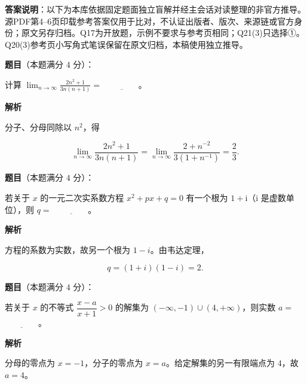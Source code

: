 

\begin{gktip}
\textbf{答案说明}：以下为本库依据固定题面独立盲解并经主会话对读整理的非官方推导。源PDF第4–6页印载参考答案仅用于比对，不认证出版者、版次、来源链或官方身份；原文另存归档。Q17为开放题，示例不要求与参考页相同；Q21(3)只选择①。Q20(3)参考页小写角式笔误保留在原文归档，本稿使用独立推导。
\end{gktip}

\begin{answer}

\textbf{题目}（本题满分 $4$ 分）：

计算 $\displaystyle\lim_{n\to\infty}\frac{2n^2+1}{3n(n+1)}=$ $\underline{\qquad\qquad}$。

\textbf{解析}

分子、分母同除以 $n^2$，得

\nopagebreak[4]
\[
\lim_{n\to\infty}\frac{2n^2+1}{3n(n+1)}
=\lim_{n\to\infty}\frac{2+n^{-2}}{3(1+n^{-1})}=\frac23.
\]


\end{answer}
\begin{answer}

\textbf{题目}（本题满分 $4$ 分）：

若关于 $x$ 的一元二次实系数方程 $x^2+px+q=0$ 有一个根为 $1+\mathrm{i}$（$\mathrm{i}$ 是虚数单位），则 $q=$ $\underline{\qquad\qquad}$。

\textbf{解析}

方程的系数为实数，故另一个根为 $1-i$。由韦达定理，

\nopagebreak[4]
\[
q=(1+i)(1-i)=2.
\]


\end{answer}
\begin{answer}

\textbf{题目}（本题满分 $4$ 分）：

若关于 $x$ 的不等式 $\dfrac{x-a}{x+1}>0$ 的解集为 $(-\infty,-1)\cup(4,+\infty)$，则实数 $a=$ $\underline{\qquad\qquad}$。

\textbf{解析}

分母的零点为 $x=-1$，分子的零点为 $x=a$。给定解集的另一有限端点为 $4$，故 $a=4$。


\end{answer}
